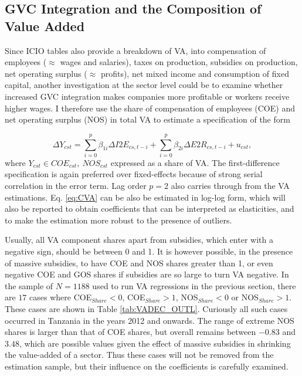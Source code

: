 \documentclass[a4paper]{article}
\begin{document}
\subsection{GVC Integration and the Composition of Value Added}
Since ICIO tables also provide a breakdown of VA, into compensation of employees ($\approx$ wages and salaries), taxes on production, subsidies on production, net operating surplus ($\approx$ profits), net mixed income and consumption of fixed capital, another investigation at the sector level could be to examine whether increased GVC integration makes companies more profitable or workers receive higher wages. I therefore use the share of compensation of employees (COE) and net operating surplus (NOS) in total VA to estimate a specification of the form

\begin{equation} \label{eq:CVA}
\Delta Y_{cst} = \sum_{i=0}^p \beta_{1i} \Delta I2E_{cs,t-i} + \sum_{i = 0}^p \beta_{2i} \Delta E2R_{cs,t-i}  + u_{cst},
\end{equation}
where $Y_{cst} \in COE_{cst},\ NOS_{cst}$ expressed as a share of VA. The first-difference specification is again preferred over fixed-effects because of strong serial correlation in the error term. Lag order $p=2$ also carries through from the VA estimations. Eq. \ref{eq:CVA} can be also be estimated in log-log form, which will also be reported to obtain coefficients that can be interpreted as elasticities, and to make the estimation more robust to the presence of outliers. \newline

Usually, all VA component shares apart from subsidies, which enter with a negative sign, should be between 0 and 1. It is however possible, in the presence of massive subsidies, to have COE and NOS shares greater than 1, or even negative COE and GOS shares  if  subsidies are so large to turn VA negative. In the sample of $N=1188$ used to run VA regressions in the previous section, there are $17$ cases where COE$_{Share} < 0$, COE$_{Share} > 1$, NOS$_{Share} < 0$ or NOS$_{Share} > 1$. These cases are shown in Table \ref{tab:VADEC_OUTL}.  Curiously all such cases occurred in Tanzania in the years 2012 and onwards. The range of extreme NOS shares is larger than that of COE shares, but overall remains between $-0.83$ and $3.48$, which are possible values given the effect of massive subsidies in shrinking the value-added of a sector. Thus these cases will not be removed from the estimation sample, but their influence on the coefficients is carefully examined. 
\end{document}
